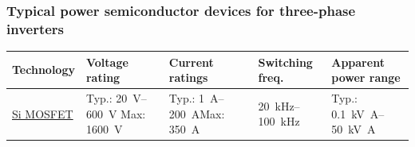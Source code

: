 \begin{frame}
    \frametitle{Typical power semiconductor devices for three-phase inverters}
    \begin{table}
        \centering

        \small
        \setlength{\tabcolsep}{4pt}
        \renewcommand{\arraystretch}{1.15}
        \begin{tabular}{p{2.2cm} p{3cm} p{3cm} p{2.2cm} p{3.5cm}}
            \toprule
            Technology                                                                                                                                                                                                                                                                                & Voltage rating & Current ratings & Switching freq. & Apparent power range \\
            \midrule
            \href{https://en.wikipedia.org/wiki/Power_MOSFET}{Si MOSFET}                                                                                                                                                                                                                              &
            Typ.: \SIrange{20}{600}{\volt}                                                                                                                                                                                                                             \newline Max: \SI{1600}{\volt} &
            Typ.: \SIrange{1}{200}{\ampere}\newline Max: \SI{350}{\ampere}                                                                                                                                                                                                                            &
            \SIrange{20}{100}{\kilo\hertz}                                                                                                                                                                                                                                                            &
            Typ.: \SIrange{0.1}{50}{\kilo\volt\ampere}                                                                                                                                                                                                                                                                                                                            \\

\end{tabular}
\end{table}
\end{frame}
